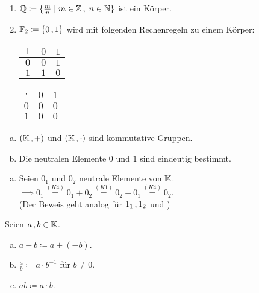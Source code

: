 \documentclass[../ana1.tex]{subfiles}
\begin{document}
\begin{bspe}\leavevmode
	\begin{enumerate}[(1)]
		\item \(\mathbb{Q} \coloneqq \{\frac{m}{n} \; \vert \; m \in \mathbb{Z} \operatorname{,} \; n \in \mathbb{N}\}\) ist ein Körper.
		\item \(\mathbb{F}_{2} \coloneqq \{0 \operatorname{,} 1\}\) wird mit folgenden Rechenregeln zu einem Körper:
			  \begin{center}
				\begin{tabular}{c|cc}
					\(+\) & \(0\) & \(1\)\\
					\midrule
					\(0\) & \(0\) & \(1\)\\
					\(1\) & \(1\) & \(0\)
				\end{tabular}
				\qquad
				\begin{tabular}{c|cc}
					\(\cdot\) & \(0\) & \(1\)\\
					\midrule
					\(0\)     & \(0\) & \(0\)\\
					\(1\)     & \(0\) & \(0\)
				\end{tabular}
			   \end{center}
	\end{enumerate}
\end{bspe}

\iftoggle{short}{}{\newpage}%

\begin{bem}\leavevmode
	\begin{enumerate}[(a)]
		\item \((\mathbb{K} \operatorname{,} +)\) und \((\mathbb{K} \operatorname{,} \cdot)\) sind kommutative Gruppen.
		\item Die neutralen Elemente \(0\) und \(1\) sind eindeutig bestimmt.
	\end{enumerate}
\end{bem}
\begin{bew}
	\begin{enumerate}[(b)]
		\item Seien \(0_{1}\) und \(0_{2}\) neutrale Elemente von \(\mathbb{K}\).\\
			  \(\implies 0_{1} \overset{ \hyperref[ax:K4]{(K4)} }{=} 0_{1} + 0_{2} \overset{ \hyperref[ax:K1]{(K1)} }{=} 0_{2} + 0_{1} \overset{ \hyperref[ax:K4]{(K4)} }{=} 0_{2}\).\\
			  (Der Beweis geht analog für \(1_{1} \operatorname{,} 1_{2}\) und \gqq{\(\cdot\)})\qedhere
	\end{enumerate}
\end{bew}

\begin{defi}
	Seien \(a \operatorname{,} b \in \mathbb{K}\).
	\begin{enumerate}[(a)]
		\item \(a - b \coloneqq a + (\minus b)\).
		\item \(\frac{a}{b} \coloneqq a \cdot b^{\minus 1}\) für \(b \neq 0\).
		\item \(ab \coloneqq a \cdot b\).
	\end{enumerate}
\end{defi}
\end{document}
